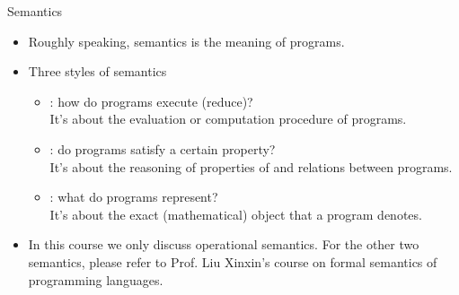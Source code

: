 \documentclass[paper=screen,mode=present,style=zysimple]{powerdot}
\begin{document}
\begin{slide}{Semantics}
\begin{itemize}
\item Roughly speaking, semantics is the meaning of programs. 
\\[0.4em]
\item Three styles of semantics
\begin{itemize}
\item {}: how do programs execute (reduce)? \\
  It's about the evaluation or computation procedure of programs.
\item {}: do programs satisfy a certain property? \\
  It's about the reasoning of properties of and relations between programs.
\item {}: what do programs represent? \\
  It's about the exact (mathematical) object that a program denotes.
\end{itemize}
\item In this course we only discuss operational semantics. For the other two semantics, 
  please refer to Prof. Liu Xinxin's course on formal semantics of programming languages.
\end{itemize}
\end{slide}
\end{document}
